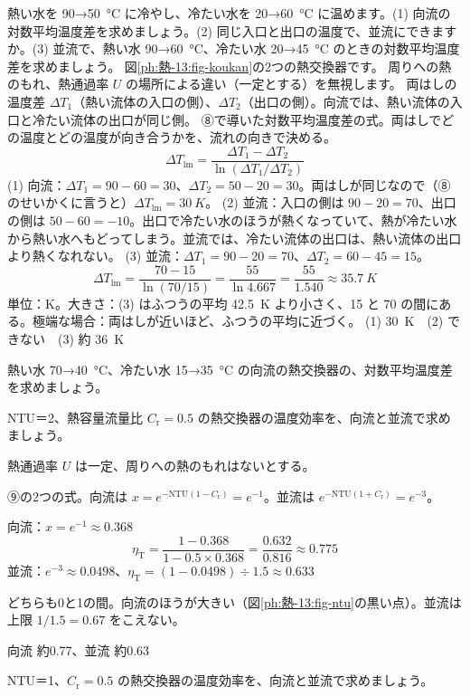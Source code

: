 \begin{phreidai}[向流と並流の対数平均温度差]
\label{ph:熱-13:ex9}熱い水を 90→\qty{50}{\celsius} に冷やし、冷たい水を 20→\qty{60}{\celsius} に温めます。(1) 向流の対数平均温度差を求めましょう。(2) 同じ入口と出口の温度で、並流にできますか。(3) 並流で、熱い水 90→\qty{60}{\celsius}、冷たい水 20→\qty{45}{\celsius} のときの対数平均温度差を求めましょう。
\phbamen
図\ref{ph:熱-13:fig-koukan}の2つの熱交換器です。
\phmushi
周りへの熱のもれ、熱通過率 $U$ の場所による違い（一定とする）を無視します。
\phzu
両はしの温度差 $\Delta T_1$（熱い流体の入口の側）、$\Delta T_2$（出口の側）。向流では、熱い流体の入口と冷たい流体の出口が同じ側。
\phriyu
⑧で導いた対数平均温度差の式。両はしでどの温度とどの温度が向き合うかを、流れの向きで決める。
\phtateru
\[ \Delta T_{\mathrm{lm}}=\frac{\Delta T_1-\Delta T_2}{\ln(\Delta T_1/\Delta T_2)} \]
\phtoku
(1) 向流：$\Delta T_1=90-60=30$、$\Delta T_2=50-20=30$。両はしが同じなので（⑧のせいかくに言うと）$\Delta T_{\mathrm{lm}}=\qty{30}{K}$。
(2) 並流：入口の側は $90-20=70$、出口の側は $50-60=-10$。出口で冷たい水のほうが熱くなっていて、熱が冷たい水から熱い水へもどってしまう。並流では、冷たい流体の出口は、熱い流体の出口より熱くなれない。
(3) 並流：$\Delta T_1=90-20=70$、$\Delta T_2=60-45=15$。
\[ \Delta T_{\mathrm{lm}}=\frac{70-15}{\ln(70/15)}=\frac{55}{\ln4.667}=\frac{55}{1.540}\approx\qty{35.7}{K} \]
\phtashikame
単位：K。大きさ：(3) はふつうの平均 \qty{42.5}{K} より小さく、15 と 70 の間にある。極端な場合：両はしが近いほど、ふつうの平均に近づく。
\kotae (1) \qty{30}{K}　(2) できない　(3) 約 \qty{36}{K}
\end{phreidai}
\begin{jibun}
熱い水 70→\qty{40}{\celsius}、冷たい水 15→\qty{35}{\celsius} の向流の熱交換器の、対数平均温度差を求めましょう。
\end{jibun}

\begin{reidai}
\label{ph:熱-13:ex10}NTU＝2、熱容量流量比 $C_{\mathrm r}=0.5$ の熱交換器の温度効率を、向流と並流で求めましょう。
\par{} 熱通過率 $U$ は一定、周りへの熱のもれはないとする。
\par\kangaekata ⑨の2つの式。向流は $x=e^{-\mathrm{NTU}(1-C_{\mathrm r})}=e^{-1}$。並流は $e^{-\mathrm{NTU}(1+C_{\mathrm r})}=e^{-3}$。
\par\shiki 向流：$x=e^{-1}\approx0.368$
\[ \eta_{\mathrm T}=\frac{1-0.368}{1-0.5\times0.368}=\frac{0.632}{0.816}\approx0.775 \]
並流：$e^{-3}\approx0.0498$、$\eta_{\mathrm T}=(1-0.0498)\div1.5\approx0.633$
\par{} どちらも0と1の間。向流のほうが大きい（図\ref{ph:熱-13:fig-ntu}の黒い点）。並流は上限 $1/1.5=0.67$ をこえない。
\par\kotae 向流 約0.77、並流 約0.63
\end{reidai}
\begin{jibun}
NTU＝1、$C_{\mathrm r}=0.5$ の熱交換器の温度効率を、向流と並流で求めましょう。
\end{jibun}


